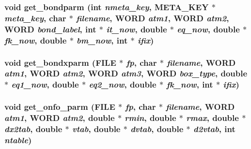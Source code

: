 \subsubsection{\setlength{\rightskip}{0pt plus 5cm}void get\_\-bondparm (int {\em nmeta\_\-key}, {\bf META\_\-KEY} $\ast$ {\em meta\_\-key}, char $\ast$ {\em filename}, {\bf WORD} {\em atm1}, {\bf WORD} {\em atm2}, {\bf WORD} {\em bond\_\-label}, int $\ast$ {\em it\_\-now}, double $\ast$ {\em eq\_\-now}, double $\ast$ {\em fk\_\-now}, double $\ast$ {\em bm\_\-now}, int $\ast$ {\em ifix})}\label{test_2dzug_2md__getparm_8c_3aaea509eabbc9ec7f60b6fd6e7a1c0c}


\subsubsection{\setlength{\rightskip}{0pt plus 5cm}void get\_\-bondxparm (FILE $\ast$ {\em fp}, char $\ast$ {\em filename}, {\bf WORD} {\em atm1}, {\bf WORD} {\em atm2}, {\bf WORD} {\em atm3}, {\bf WORD} {\em box\_\-type}, double $\ast$ {\em eq1\_\-now}, double $\ast$ {\em eq2\_\-now}, double $\ast$ {\em fk\_\-now}, int $\ast$ {\em ifix})}\label{test_2dzug_2md__getparm_8c_3b6220a5e830a4771e1424f94441f66e}


\subsubsection{\setlength{\rightskip}{0pt plus 5cm}void get\_\-onfo\_\-parm (FILE $\ast$ {\em fp}, char $\ast$ {\em filename}, {\bf WORD} {\em atm1}, {\bf WORD} {\em atm2}, double $\ast$ {\em rmin}, double $\ast$ {\em rmax}, double $\ast$ {\em dx2tab}, double $\ast$ {\em vtab}, double $\ast$ {\em dvtab}, double $\ast$ {\em d2vtab}, int {\em ntable})}\label{test_2dzug_2md__getparm_8c_5a05c8e90ce64ecb7134feba37375279}



